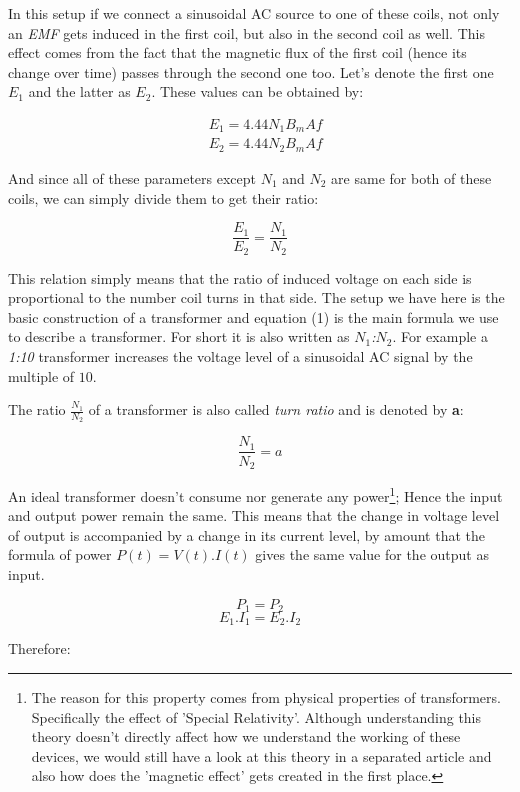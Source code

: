 \documentclass{article}
\begin{document}
	
	In this setup if we connect a sinusoidal AC source to one of these coils, not only an \textit{EMF} gets induced in the first coil, but also in the second coil as well.
	This effect comes from the fact that the magnetic flux of the first coil (hence its change over time) passes through the second one too. 
	Let's denote the first one $E_1$ and the latter as $E_2$.
	These values can be obtained by:
	
	\begin{align*}
	& E_1 = 4.44N_1B_{m}Af \\
	& E_2 = 4.44N_2B_{m}Af
	\end{align*}
	
	And since all of these parameters except $N_1$ and $N_2$ are same for both of these coils, we can simply divide them to get their ratio:
	
	\begin{equation}
	\frac{E_1}{E_2} = \frac{N_1}{N_2}
	\end{equation}
	
	This relation simply means that the ratio of induced voltage on each side is proportional to the number coil turns in that side.
	The setup we have here is the basic construction of a transformer and equation (1) is the main formula we use to describe a transformer.
	For short it is also written as \textit{$N_1$:$N_2$}.
	For example a \textit{1:10} transformer increases the voltage level of a sinusoidal AC signal by the multiple of $10$.
	
	The ratio $\frac{N_1}{N_2}$ of a transformer is also called \textit{turn ratio} and is denoted by \textbf{a}:
	
	$$ \frac{N_1}{N_2} = a $$
	
	An ideal transformer doesn't consume nor generate any power\footnote[1]{The reason for this property comes from physical properties of transformers.
	Specifically the effect of 'Special Relativity'.
	Although understanding this theory doesn't directly affect how we understand the working of these devices, we would still have a look at this theory in a separated article and also how does the 'magnetic effect' gets created in the first place.};
	Hence the input and output power remain the same.
	This means that the change in voltage level of output is accompanied by a change in its current level, by amount that the formula of power $P(t) = V(t).I(t)$ gives the same value for the output as input. 
	
	$$ P_1 = P_2$$
	$$ E_1.I_1 = E_2.I_2$$

	Therefore:
	
\end{document}

